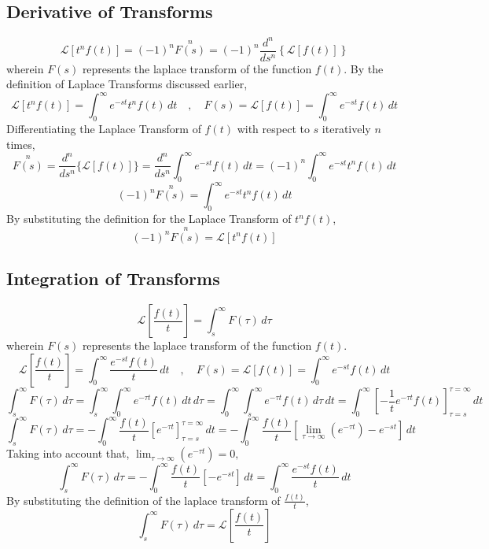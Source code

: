 \documentclass[a4paper, 12pt]{report}
\def\f{\frac}
\def\l{\left}
\def\r{\right}
\def\dst{\displaystyle}
\def\lap{\mathcal{L}}
\begin{document}
\begin{center}
\subsection{Derivative of Transforms}
$$\lap[t^nf(t)] = (-1)^n\overset{n}{F(s)} = (-1)^n\f{d^n}{ds^n}\l\{\lap[f(t)]\r\}$$
wherein $F(s)$ represents the laplace transform of the function $f(t)$. By the definition of Laplace Transforms discussed earlier,
$$\lap[t^nf(t)] = \int^{\infty}_{0}e^{-st}t^nf(t)\,dt\quad,\quad F(s) = \lap[f(t)] = \int^{\infty}_{0}e^{-st}f(t)\,dt$$
Differentiating the Laplace Transform of $f(t)$ with respect to $s$ iteratively $n$ times,
$$\overset{n}{F(s)} = \f{d^n}{ds^n}\{\lap[f(t)]\} = \f{d^n}{ds^n}\int^{\infty}_{0}e^{-st}f(t)\,dt = (-1)^n\int^{\infty}_{0}e^{-st}t^n f(t)\,dt$$
$$(-1)^n\overset{n}{F(s)} = \int^{\infty}_{0}e^{-st}t^n f(t)\,dt$$
By substituting the definition for the Laplace Transform of $\dst{t^nf(t)}$,
$$(-1)^n\overset{n}{F(s)} = \lap[t^nf(t)]$$
\subsection{Integration of Transforms}
$$\lap\l[\f{f(t)}{t}\r] = \int^{\infty}_{s}F(\tau)\,d\tau$$
wherein $F(s)$ represents the laplace transform of the function $f(t)$.
$$\lap\l[\f{f(t)}{t}\r] = \int^{\infty}_{0}\f{e^{-st}f(t)}{t}\,dt\quad,\quad F(s) = \lap[f(t)] = \int^{\infty}_{0}e^{-st}f(t)\,dt$$
$$\int^{\infty}_{s}F(\tau)\,d\tau = \int^{\infty}_{s}\int^{\infty}_{0}e^{-\tau t}f(t)\,dt\,d\tau = \int^{\infty}_{0}\int^{\infty}_{s}e^{-\tau t}f(t)\,d\tau\,dt = \int^{\infty}_{0}\l[-\f{1}{t}e^{-\tau t}f(t)\r]^{\tau = \infty}_{\tau = s}\,dt$$
$$\int^{\infty}_{s}F(\tau)\,d\tau = -\int^{\infty}_{0}\f{f(t)}{t}\l[e^{-\tau t}\r]^{\tau = \infty}_{\tau = s}\,dt = -\int^{\infty}_{0}\f{f(t)}{t}\l[\lim_{\tau\to\infty}(e^{-\tau t}) - e^{-s t}\r]\,dt$$
Taking into account that, $\dst{\lim_{\tau\to\infty}(e^{-\tau t})} = 0,$
$$\int^{\infty}_{s}F(\tau)\,d\tau = -\int^{\infty}_{0}\f{f(t)}{t}\l[- e^{-s t}\r]\,dt = \int^{\infty}_{0}\f{e^{-s t}f(t)}{t}\,dt$$
By substituting the definition of the laplace transform of $\dst{\f{f(t)}{t}}$,
$$\int^{\infty}_{s}F(\tau)\,d\tau = \lap\l[\f{f(t)}{t}\r]$$

\end{center}
\end{document}
